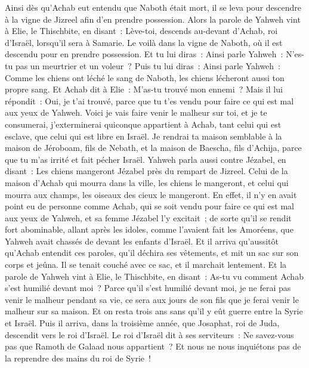 \begin{multicols}{2}
Ainsi dès qu'Achab eut entendu que Naboth était mort, il se leva pour descendre à la vigne de Jizreel afin d'en prendre  possession.
Alors la parole de Yahweh vint à Elie, le Thischbite, en disant~:
Lève-toi, descends au-devant d'Achab, roi d'Israël, lorsqu'il sera à Samarie. Le voilà dans la vigne de Naboth, où il est descendu pour en prendre possession.
Et tu lui diras~: Ainsi parle Yahweh~: N'es-tu pas un meurtrier et un voleur~? Puis tu lui diras~: Ainsi parle Yahweh~: Comme les chiens ont léché le sang de Naboth, les chiens lécheront aussi ton propre sang.
Et Achab dit à Elie~: M'as-tu trouvé mon ennemi~? Mais il lui répondit~: Oui, je t'ai trouvé, parce que tu t'es vendu pour faire ce qui est mal aux yeux de Yahweh.
Voici je vais faire venir le malheur sur toi, et je te consumerai, j'exterminerai quiconque appartient à Achab, tant celui qui est esclave, que celui qui est libre en Israël.
Je rendrai ta maison semblable à la maison de Jéroboam, fils de Nebath, et la maison de Baescha, fils d'Achija, parce que tu m'as irrité et fait pécher Israël.
Yahweh parla aussi contre Jézabel, en disant~: Les chiens mangeront Jézabel près du rempart de Jizreel.
Celui de la maison d'Achab qui mourra dans la ville, les chiens le mangeront, et celui qui mourra aux champs, les oiseaux des cieux le mangeront.
En effet, il n'y en avait point eu de personne comme Achab, qui se soit vendu pour faire ce qui est mal aux yeux de Yahweh, et sa femme Jézabel l'y excitait~;
de sorte qu'il se rendit fort abominable, allant après les idoles, comme l'avaient fait les Amoréens, que Yahweh avait chassés de devant les enfants d'Israël.
Et il arriva qu'aussitôt qu'Achab entendit ces paroles, qu'il déchira ses vêtements, et mit un sac sur son corps et jeûna. Il se tenait couché avec ce sac, et il marchait lentement.
Et la parole de Yahweh vint à Elie, le Thischbite, en disant~:
As-tu vu comment Achab s'est humilié devant moi~? Parce qu'il s'est humilié devant moi, je ne ferai pas venir le malheur pendant sa vie, ce sera aux jours de son fils que je ferai venir le malheur sur sa maison.
\VerseOne{}Et on resta trois ans sans qu'il y eût guerre entre la Syrie et Israël.
Puis il arriva, dans la troisième année, que Josaphat, roi de Juda, descendit vers le roi d'Israël.
Le roi d'Israël dit à ses serviteurs~: Ne savez-vous pas que Ramoth de Galaad nous appartient~? Et nous ne nous inquiétons pas de la reprendre des mains du roi de Syrie~!

\end{multicols}
